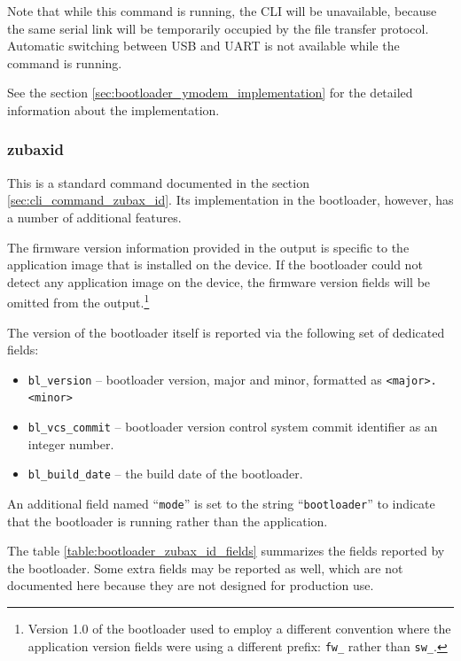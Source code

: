 \documentclass{zubaxdoc}
\begin{document}
Note that while this command is running, the CLI will be unavailable,
because the same serial link will be temporarily occupied by the file transfer protocol.
Automatic switching between USB and UART is not available while the command is running.

See the section \ref{sec:bootloader_ymodem_implementation} for the detailed information about the implementation.

\subsubsection{zubax\textunderscore{}id}

This is a standard command documented in the section \ref{sec:cli_command_zubax_id}.
Its implementation in the bootloader, however, has a number of additional features.

The firmware version information provided in the output is specific to the application image that is
installed on the device.
If the bootloader could not detect any application image on the device,
the firmware version fields will be omitted from the
output.\footnote{Version 1.0 of the bootloader used to employ a different convention where the application
version fields were using a different prefix: \texttt{fw\_} rather than \texttt{sw\_}.}

The version of the bootloader itself is reported via the following set of dedicated fields:
\begin{itemize}
    \item \verb|bl_version| -- bootloader version, major and minor, formatted as \verb|<major>.<minor>|
    \item \verb|bl_vcs_commit| -- bootloader version control system commit identifier as an integer number.
    \item \verb|bl_build_date| -- the build date of the bootloader.
\end{itemize}

An additional field named ``\verb|mode|'' is set to the string ``\verb|bootloader|''
to indicate that the bootloader is running rather than the application.

The table \ref{table:bootloader_zubax_id_fields} summarizes the fields reported by the bootloader.
Some extra fields may be reported as well,
which are not documented here because they are not designed for production use.
\end{document}
